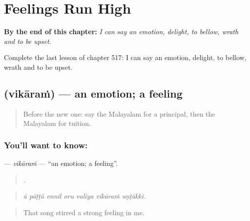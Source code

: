 
\chapter{Feelings Run High}
\label{ch:ml-feelings-run-high}

\begin{chapteropening}
\textbf{By the end of this chapter:} \emph{I can say an emotion, delight, to bellow, wrath and to be upset.}

Complete the last lesson of chapter 517: I can say an emotion, delight, to bellow, wrath and to be upset.
\end{chapteropening}

\section[\texorpdfstring{\ml{വികാരം} (vikāraṁ)}{വികാരം (vikāraṁ)}]{ (vikāraṁ) — an emotion; a feeling}

\label{lesson:ML-C517-vikaram}



\begin{quote}
Before the new one: say the Malayalam for a principal, then the Malayalam for tuition.
\end{quote}

\subsection*{You'll want to know: }
\textbf{} — \emph{vikāraṁ} — \textquotedblleft{}an emotion; a feeling\textquotedblright{}.

\begin{quote}
      .
\end{quote}

\begin{quote}
\emph{ā pāṭṭŭ ennil oru valiya vikāraṁ uṇṭākki.}
\end{quote}

\begin{quote}
That song stirred a strong feeling in me.
\end{quote}

